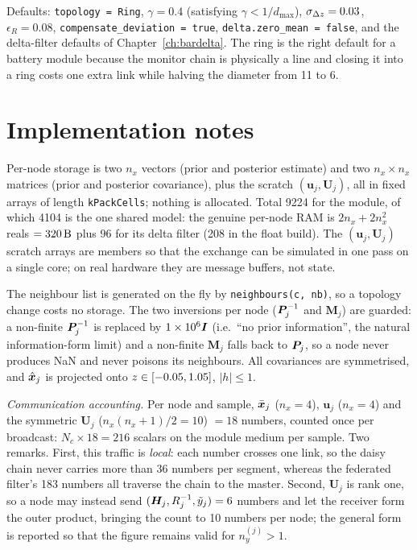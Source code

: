 Defaults: \texttt{topology = Ring}, $\gamma=\num{0.4}$ (satisfying $\gamma<1/d_{\max}$),
$\sigma_{\Delta z}=\num{0.03}$, $\epsilon_R=\num{0.08}$,
\texttt{compensate\_deviation = true}, \texttt{delta.zero\_mean = false}, and the delta-filter
defaults of Chapter~\ref{ch:bardelta}. The ring is the right default for a battery module because
the monitor chain is physically a line and closing it into a ring costs one extra link while
halving the diameter from \num{11} to \num{6}.

\section{Implementation notes}
Per-node storage is two $n_x$ vectors (prior and posterior estimate) and two $n_x\times n_x$
matrices (prior and posterior covariance), plus the scratch $(\bm{u}_j,\bm{U}_j)$, all in fixed
arrays of length \texttt{kPackCells}; nothing is allocated. Total \SI{9224}{\byte} for the module,
of which \SI{4104}{\byte} is the one shared model: the genuine per-node RAM is
$2n_x + 2n_x^2$ reals $=\SI{320}{\byte}$ plus \SI{96}{\byte} for its delta filter
(\SI{208}{\byte} in the float build). The $(\bm{u}_j,\bm{U}_j)$ scratch arrays are members so
that the exchange can be simulated in one pass on a single core; on real hardware they are
message buffers, not state.

The neighbour list is generated on the fly by \texttt{neighbours(c, nb)}, so a topology change
costs no storage. The two inversions per node ($\bm{P}_j^{-1}$ and $\bm{M}_j$) are guarded: a
non-finite $\bm{P}_j^{-1}$ is replaced by $\num{1e6}\bm{I}$ (i.e.\ ``no prior information'', the natural
information-form limit) and a non-finite $\bm{M}_j$ falls back to $\bm{P}_j$, so a node never
produces NaN and never poisons its neighbours. All covariances are symmetrised, and
$\hat{\bm{x}}_j$ is projected onto $z\in[-0.05,1.05]$, $|h|\le1$.

\emph{Communication accounting.} Per node and sample, $\bar{\bm{x}}_j$ ($n_x=4$), $\bm{u}_j$
($n_x=4$) and the symmetric $\bm{U}_j$ ($n_x(n_x{+}1)/2=10$) $=18$ numbers, counted once per
broadcast: $N_c\times18 = \num{216}$ scalars on the module medium per sample. Two remarks. First,
this traffic is \emph{local}: each number crosses one link, so the daisy chain never carries more
than \num{36} numbers per segment, whereas the federated filter's \num{183} numbers all traverse
the chain to the master. Second, $\bm{U}_j$ is rank one, so a node may instead send
$(\bm{H}_j, R_j^{-1}, \tilde y_j) = 6$ numbers and let the receiver form the outer product, bringing
the count to \num{10} numbers per node; the general form is reported so that the figure remains
valid for $n_y^{(j)}>1$.

